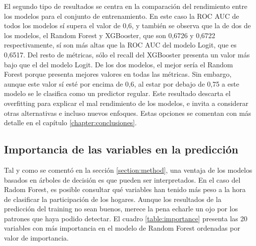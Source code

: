 El segundo tipo de resultados se centra en la comparación del rendimiento entre los modelos para el conjunto de entrenamiento. En este caso la ROC AUC de todos los modelos sí supera el valor de 0,6, y también se observa que la de dos de los modelos, el Random Forest y XGBooster, que son 0,6726 y 0,6722 respectivamente, sí son más altas que la ROC AUC del modelo Logit, que es 0,6517. Del resto de métricas, sólo el recall del XGBooster presenta un valor más bajo que el del modelo Logit. De los dos modelos, el mejor sería el Random Forest porque presenta mejores valores en todas las métricas. Sin embargo, aunque este valor sí esté por encima de 0,6, al estar por debajo de 0,75 a este modelo se le clasifica como un predictor regular. Este resultado descarta el overfitting para explicar el mal rendimiento de los modelos, e invita a considerar otras alternativas e incluso nuevos enfoques. Estas opciones se comentan con más detalle en el capítulo \ref{chapter:conclusiones}.

\subsection*{Importancia de las variables en la predicción}

Tal y como se comentó en la sección \ref{section:method}, una ventaja de los modelos basados en árboles de decisión es que pueden ser interpretados. En el caso del Radom Forest, es posible consultar qué variables han tenido más peso a la hora de clasificar la participación de los hogares. Aunque los resultados de la predicción del training no sean buenos, merece la pena echarle un ojo por los patrones que haya podido detectar. El cuadro \ref{table:importance} presenta las 20 variables con más importancia en el modelo de Random Forest ordenadas por valor de importancia.

